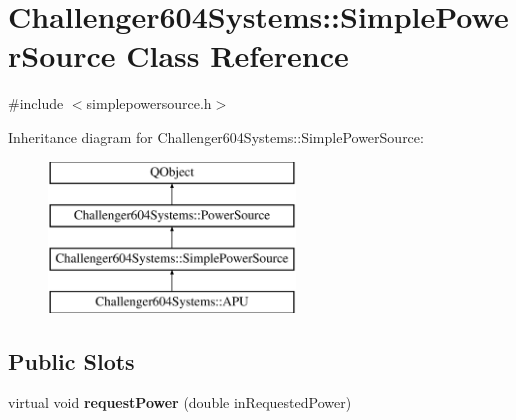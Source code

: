 \hypertarget{class_challenger604_systems_1_1_simple_power_source}{\section{Challenger604\-Systems\-:\-:Simple\-Power\-Source Class Reference}
\label{class_challenger604_systems_1_1_simple_power_source}
}


{\ttfamily \#include $<$simplepowersource.\-h$>$}

Inheritance diagram for Challenger604\-Systems\-:\-:Simple\-Power\-Source\-:\begin{figure}[H]
\begin{center}
\leavevmode
\includegraphics[height=4.000000cm]{class_challenger604_systems_1_1_simple_power_source}
\end{center}
\end{figure}
\subsection*{Public Slots}
\begin{DoxyCompactItemize}
\item 
\hypertarget{class_challenger604_systems_1_1_simple_power_source_a4fdedf92e8411f84df02d4a3b1f8d35a}{virtual void {\bfseries request\-Power} (double in\-Requested\-Power)}\label{class_challenger604_systems_1_1_simple_power_source_a4fdedf92e8411f84df02d4a3b1f8d35a}

\end{DoxyCompactItemize}
